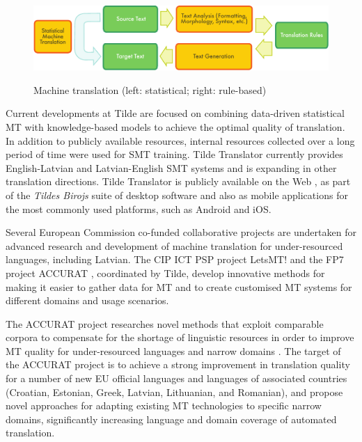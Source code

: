 \begin{multicols}{2}
\begin{figure}[htb]
  \center
  \includegraphics[width=\textwidth]{../_media/english/machine_translation}
  \caption{Machine translation (left: statistical; right: rule-based)}
   \label{fig:mtarch_en}
\end{figure}

Current developments at Tilde are focused on combining data-driven statistical MT with knowledge-based models to achieve the optimal quality of translation.
In addition to publicly available resources, internal resources collected over a long period of time were used for SMT training.
Tilde Translator currently provides English-Latvian and Latvian-English SMT systems and is expanding in other translation directions.
Tilde Translator is publicly available on the Web \cite{Meta28, Meta29}, as part of the \textit{Tildes Birojs} suite of desktop software and also as mobile applications for the most commonly used platforms, such as Android and iOS.

Several European Commission co-funded collaborative projects are undertaken for advanced research and development of machine translation for under-resourced languages, including Latvian.
The CIP ICT PSP project LetsMT! \cite{Meta30} and the FP7 project ACCURAT \cite{Meta31}, coordinated by Tilde, develop innovative methods for making it easier to gather data for MT and to create customised MT systems for different domains and usage scenarios.

The ACCURAT project researches novel methods that exploit comparable corpora to compensate for the shortage of linguistic resources in order to improve MT quality for under-resourced languages and narrow domains \cite{Meta32, Meta33}.
The target of the ACCURAT project is to achieve a strong improvement in translation quality for a number of new EU official languages and languages of associated countries (Croatian, Estonian, Greek, Latvian, Lithuanian, and Romanian), and propose novel approaches for adapting existing MT technologies to specific narrow domains, significantly increasing language and domain coverage of automated translation.


\end{multicols}
